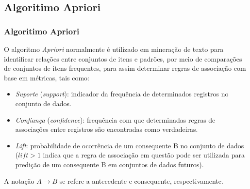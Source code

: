 \documentclass{beamer}
\begin{document}
\subsection{Algoritimo Apriori}
\begin{frame}
\frametitle {Algoritimo Apriori}
O algoritmo \textit{Apriori} normalmente é utilizado em mineração de texto para identificar relações entre conjuntos de itens e padrões, por meio de comparações de conjuntos de itens frequentes, para assim determinar regras de associação com base em métricas, tais como:
\begin{itemize}
\item \textit{Suporte} (\textit{support}): indicador da frequência de determinados registros no conjunto de dados.
\item \textit{Confiança} (\textit{confidence}): frequência com que determinadas regras de associações entre registros são encontradas como verdadeiras.
\item  \textit{Lift}: probabilidade de ocorrência de um consequente B no conjunto de dados ($lift > 1$ indica que a regra de associação em questão pode ser utilizada para predição de um consequente B em conjuntos de dados futuros).
\end{itemize}

A notação $A \rightarrow B$ se refere a antecedente e consequente, respectivamente.
 
\end{frame}
\end{document}
